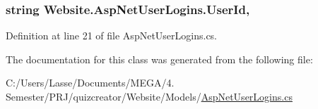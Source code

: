 \subsubsection[{User\+Id}]{\setlength{\rightskip}{0pt plus 5cm}string Website.\+Asp\+Net\+User\+Logins.\+User\+Id\hspace{0.3cm}{\ttfamily [get]}, {\ttfamily [set]}}\label{class_website_1_1_asp_net_user_logins_accca4708f6580878d0e8f611d4e7b674}


Definition at line 21 of file Asp\+Net\+User\+Logins.\+cs.



The documentation for this class was generated from the following file\+:\begin{DoxyCompactItemize}
\item 
C\+:/\+Users/\+Lasse/\+Documents/\+M\+E\+G\+A/4. Semester/\+P\+R\+J/quizcreator/\+Website/\+Models/\hyperlink{_asp_net_user_logins_8cs}{Asp\+Net\+User\+Logins.\+cs}\end{DoxyCompactItemize}
